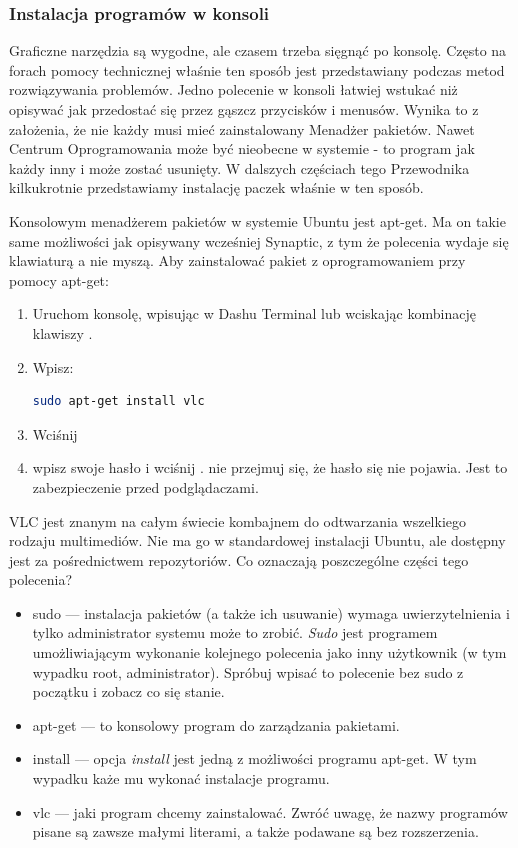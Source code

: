 \subsubsection{Instalacja programów w konsoli}
Graficzne narzędzia są wygodne, ale czasem trzeba sięgnąć po konsolę. Często na forach pomocy technicznej właśnie ten sposób jest przedstawiany podczas metod rozwiązywania problemów. Jedno polecenie w konsoli łatwiej wstukać niż opisywać jak przedostać się przez gąszcz przycisków i menusów. Wynika to z założenia, że nie każdy musi mieć zainstalowany Menadżer pakietów. Nawet Centrum Oprogramowania może być nieobecne w systemie - to program jak każdy inny i może zostać usunięty.
W dalszych częściach tego Przewodnika kilkukrotnie przedstawiamy instalację paczek właśnie w ten sposób.

Konsolowym menadżerem pakietów w systemie Ubuntu jest \textcolor{ubuntu_orange}{apt-get}. Ma on takie same możliwości jak opisywany wcześniej Synaptic, z tym że polecenia wydaje się klawiaturą a nie myszą. Aby zainstalować pakiet z oprogramowaniem przy pomocy apt-get:
\begin{enumerate}
\item Uruchom konsolę, wpisując w Dashu \textcolor{ubuntu_orange}{Terminal} lub wciskając kombinację klawiszy .
\item Wpisz:
\begin{lstlisting}[language=bash]
sudo apt-get install vlc
\end{lstlisting}
\item Wciśnij \keys{\returnwin}
\item wpisz swoje hasło i wciśnij \keys{\returnwin}. nie przejmuj się, że hasło się nie pojawia. Jest to zabezpieczenie przed podglądaczami.
\end{enumerate}
VLC jest znanym na całym świecie kombajnem do odtwarzania wszelkiego rodzaju multimediów. Nie ma go w standardowej instalacji Ubuntu, ale dostępny jest za pośrednictwem repozytoriów. Co oznaczają poszczególne części tego polecenia?
\begin{itemize}
\item \textcolor{ubuntu_orange}{sudo} --- instalacja pakietów (a także ich usuwanie) wymaga uwierzytelnienia i tylko administrator systemu może to zrobić. \textit{Sudo} jest programem umożliwiającym wykonanie kolejnego polecenia jako inny użytkownik (w tym wypadku root, administrator). Spróbuj wpisać to polecenie bez sudo z początku i zobacz co się stanie.
\item \textcolor{ubuntu_orange}{apt-get} --- to konsolowy program do zarządzania pakietami.
\item \textcolor{ubuntu_orange}{install} --- opcja \textit{install} jest jedną z możliwości programu apt-get. W tym wypadku każe mu wykonać instalacje programu.
\item \textcolor{ubuntu_orange}{vlc} --- jaki program chcemy zainstalować. Zwróć uwagę, że nazwy programów pisane są zawsze małymi literami, a także podawane są bez rozszerzenia.
\end{itemize}

